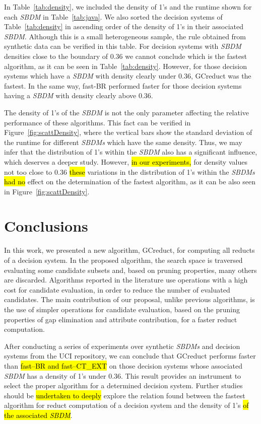 \documentclass[number,preprint,review,12pt]{elsarticle}
\begin{document}
	\label{par:kind}
	In Table~\ref{tab:density}, we included the density of 1's and the runtime shown for each \textit{SBDM} in Table~\ref{tab:java}. We also sorted the decision systems of Table~\ref{tab:density} in ascending order of the density of 1's in their associated \textit{SBDM}. Although this is a small heterogeneous sample, the rule obtained from synthetic data can be verified in this table. For decision systems with \textit{SBDM} densities close to the boundary of 0.36 we cannot conclude which is the fastest algorithm, as it can be seen in Table~\ref{tab:density}. However, for those decision systems which have a \textit{SBDM} with density clearly under 0.36, GCreduct was the fastest. In the same way, fast-BR performed faster for those decision systems having a \textit{SBDM} with density clearly above 0.36.
	
	The density of 1's of the \textit{SBDM} is not the only parameter affecting the relative performance of these algorithms. This fact can be verified in Figure~\ref{fig:scattDensity}, where the vertical bars show the standard deviation of the runtime for different \textit{SBDMs} which have the same density. Thus, we may infer that the distribution of 1's within the \textit{SBDM} also has a significant influence, which deserves a deeper study. However, \hl{in our experiments,} for density values not too close to 0.36 \hl{these} variations in the distribution of 1's within the \textit{SBDMs} \hl{had no} effect on the determination of the fastest algorithm, as it can be also seen in Figure~\ref{fig:scattDensity}.\label{par:distribution}

\section{Conclusions}\label{conclusions}
	In this work, we presented a new algorithm, GCreduct, for computing all reducts of a decision system. In the proposed algorithm, the search space is traversed evaluating some candidate subsets and, based on pruning properties, many others are discarded. Algorithms reported in the literature use operations with a high cost for candidate evaluation, in order to reduce the number of evaluated candidates. The main contribution of our proposal, unlike previous algorithms, is the use of simpler operations for candidate evaluation, based on the pruning properties of gap elimination and attribute contribution, for a faster reduct computation. 
	
	After conducting a series of experiments over synthetic \textit{SBDMs} and decision systems from the UCI repository, we can conclude that GCreduct performs faster than \hl{fast--BR and fast--CT\_EXT} on those decision systems whose associated \textit{SBDM} has a density of 1's under 0.36. This result provides an instrument to select the proper algorithm for a determined decision system. Further studies should be \hl{undertaken to deeply} explore the relation found between the fastest algorithm for reduct computation of a decision system and the density of 1's \hl{of the associated \textit{SBDM}}. 
	
\end{document}

